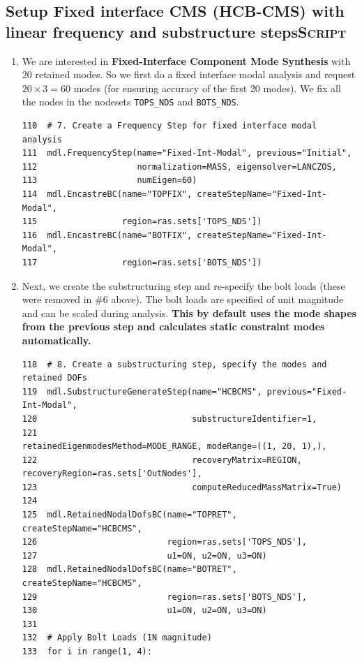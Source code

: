 \documentclass[11pt]{article}
\begin{document}
\subsection{Setup Fixed interface CMS (HCB-CMS) with linear frequency and substructure steps\hfill{}\textsc{Script}}
\label{sec:org2371e4c}
\begin{enumerate}
\item We are interested in \textbf{Fixed-Interface Component Mode Synthesis} with 20 retained modes.
So we first do a fixed interface modal analysis and request \(20\times3 = 60\) modes (for ensuring accuracy of the first 20 modes).
We fix all the nodes in the nodesets \texttt{TOPS\_NDS} and \texttt{BOTS\_NDS}.
\begin{verbatim}
110  # 7. Create a Frequency Step for fixed interface modal analysis
111  mdl.FrequencyStep(name="Fixed-Int-Modal", previous="Initial",
112                    normalization=MASS, eigensolver=LANCZOS,
113                    numEigen=60)
114  mdl.EncastreBC(name="TOPFIX", createStepName="Fixed-Int-Modal",
115                 region=ras.sets['TOPS_NDS'])
116  mdl.EncastreBC(name="BOTFIX", createStepName="Fixed-Int-Modal",
117                 region=ras.sets['BOTS_NDS'])
\end{verbatim}
\item Next, we create the substructuring step and re-specify the bolt loads (these were removed in \#6 above).
The bolt loads are specified of unit magnitude and can be scaled during analysis.
\textbf{This by default uses the mode shapes from the previous step and calculates static constraint modes automatically.}
\begin{verbatim}
118  # 8. Create a substructuring step, specify the modes and retained DOFs
119  mdl.SubstructureGenerateStep(name="HCBCMS", previous="Fixed-Int-Modal",
120                               substructureIdentifier=1, 
121                               retainedEigenmodesMethod=MODE_RANGE, modeRange=((1, 20, 1),),
122                               recoveryMatrix=REGION, recoveryRegion=ras.sets['OutNodes'],
123                               computeReducedMassMatrix=True)
124  
125  mdl.RetainedNodalDofsBC(name="TOPRET", createStepName="HCBCMS", 
126                          region=ras.sets['TOPS_NDS'], 
127                          u1=ON, u2=ON, u3=ON)
128  mdl.RetainedNodalDofsBC(name="BOTRET", createStepName="HCBCMS", 
129                          region=ras.sets['BOTS_NDS'], 
130                          u1=ON, u2=ON, u3=ON)
131  
132  # Apply Bolt Loads (1N magnitude)
133  for i in range(1, 4):

\end{verbatim}
\end{enumerate}
\end{document}
